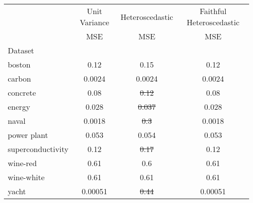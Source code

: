 \begin{tabular}{l|c|c|c}
\toprule
{} & {Unit Variance} & {Heteroscedastic} & {Faithful Heteroscedastic} \\
{} & {MSE} & {MSE} & {MSE} \\
{Dataset} & {} & {} & {} \\
\midrule
boston & 0.12 & 0.15 & 0.12 \\
carbon & 0.0024 & 0.0024 & 0.0024 \\
concrete & 0.08 & \sout{0.12} & 0.08 \\
energy & 0.028 & \sout{0.037} & 0.028 \\
naval & 0.0018 & \sout{0.3} & 0.0018 \\
power plant & 0.053 & 0.054 & 0.053 \\
superconductivity & 0.12 & \sout{0.17} & 0.12 \\
wine-red & 0.61 & 0.6 & 0.61 \\
wine-white & 0.61 & 0.61 & 0.61 \\
yacht & 0.00051 & \sout{0.44} & 0.00051 \\
\bottomrule
\end{tabular}
